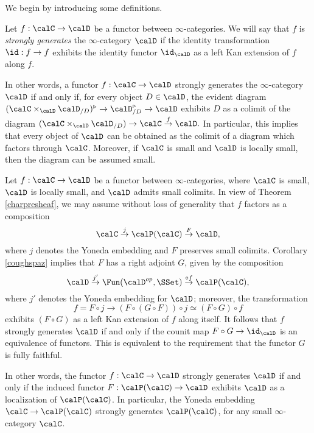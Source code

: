 We begin by introducing some definitions.

\begin{definition}\label{coughball}
Let $f: \calC \rightarrow \calD$ be a functor between $\infty$-categories.
We will say that $f$ is {\em strongly generates} the $\infty$-category $\calD$ if the identity transformation
$\id: f \rightarrow f$ exhibits the identity functor $\id_{\calD}$ as a left Kan extension of $f$
along $f$.
\end{definition}

\begin{remark}
In other words, a functor $f: \calC \rightarrow \calD$ strongly generates the $\infty$-category
$\calD$ if and only if, for every object $D \in \calD$, the evident diagram
$( \calC \times_{\calD} \calD_{/D} )^{\triangleright} \rightarrow \calD_{/D}^{\triangleright} \rightarrow \calD$
exhibits $D$ as a colimit of the diagram
$(\calC \times_{\calD} \calD_{/D}) \rightarrow \calC \stackrel{f}{\rightarrow} \calD.$
In particular, this implies that every object of $\calD$ can be obtained as the colimit of a diagram
which factors through $\calC$. Moreover, if $\calC$ is small and $\calD$ is locally small, then the diagram can be assumed small.
\end{remark}

\begin{remark}\label{copse}
Let $f: \calC \rightarrow \calD$ be a functor between $\infty$-categories, where $\calC$ is small, $\calD$ is locally small, and $\calD$ admits small colimits. In view of Theorem \ref{charpresheaf}, we may assume without loss of generality that $f$ factors as a composition
$$ \calC \stackrel{j}{\rightarrow} \calP(\calC) \stackrel{F}{\rightarrow} \calD,$$
where $j$ denotes the Yoneda embedding and $F$ preserves small colimits.
Corollary \ref{coughspaz} implies that $F$ has a right adjoint $G$, given by the composition
$$ \calD \stackrel{j'}{\rightarrow} \Fun( \calD^{op}, \SSet) \stackrel{\circ f}{\rightarrow} \calP(\calC),$$
where $j'$ denotes the Yoneda embedding for $\calD$; moreover, the transformation
$$ f = F \circ j \rightarrow (F \circ (G \circ F)) \circ j \simeq (F \circ G) \circ f$$
exhibits $(F \circ G)$ as a left Kan extension of $f$ along itself. It follows that $f$
strongly generates $\calD$ if and only if the counit map $F \circ G \rightarrow \id_{\calD}$ is an equivalence of functors. This is equivalent to the requirement that the functor $G$ is fully faithful.

In other words, the functor $f: \calC \rightarrow \calD$ strongly generates $\calD$ if and only if the
induced functor $F: \calP(\calC) \rightarrow \calD$ exhibits $\calD$ as a localization of
$\calP(\calC)$. In particular, the Yoneda embedding $\calC \rightarrow \calP(\calC)$
strongly generates $\calP(\calC)$, for any small $\infty$-category $\calC$.
\end{remark}


